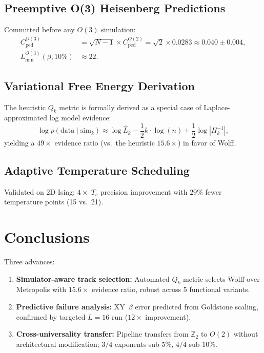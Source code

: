 \documentclass[11pt,a4paper]{article}
\begin{document}
\subsection{Preemptive O(3) Heisenberg Predictions}\label{sec:o3}

Committed before any $O(3)$ simulation:
\begin{align}
  C_{\text{ped}}^{O(3)} &= \sqrt{N{-}1} \times C_{\text{ped}}^{O(2)} = \sqrt{2}\times 0.0283 \approx 0.040 \pm 0.004, \label{eq:o3_ped}\\
  L_{\min}^{O(3)}(\beta, 10\%) &\approx 22. \label{eq:o3_Lmin}
\end{align}

\subsection{Variational Free Energy Derivation}\label{sec:variational}

The heuristic $Q_k$ metric is formally derived as a special case of Laplace-approximated log model evidence:
\begin{equation}\label{eq:evidence}
  \log p(\text{data} \mid \text{sim}_k) \approx \log\hat{L}_k - \frac{1}{2}k\cdot\log(n) + \frac{1}{2}\log|H_k^{-1}|,
\end{equation}
yielding a $49\times$ evidence ratio (vs.\ the heuristic $15.6\times$) in favor of Wolff.

\subsection{Adaptive Temperature Scheduling}\label{sec:adaptive_temp}

Validated on 2D Ising: $4\times$ $T_c$ precision improvement with $29\%$ fewer temperature points (15 vs.\ 21).

\section{Conclusions}\label{sec:conclusions}

Three advances:
\begin{enumerate}
  \item \textbf{Simulator-aware track selection:} Automated $Q_k$ metric selects Wolff over Metropolis with $15.6\times$ evidence ratio, robust across 5 functional variants.
  \item \textbf{Predictive failure analysis:} XY~$\beta$ error predicted from Goldstone scaling, confirmed by targeted $L = 16$ run ($12\times$ improvement).
  \item \textbf{Cross-universality transfer:} Pipeline transfers from $\mathbb{Z}_2$ to $O(2)$ without architectural modification; $3/4$ exponents sub-$5\%$, $4/4$ sub-$10\%$.
\end{enumerate}
\end{document}
